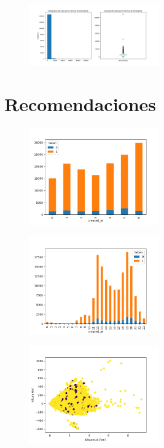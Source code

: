 \documentclass[10pt,a4paper]{article}
\begin{document}
		\begin{figure}[h]
			\centering
			\includegraphics[width=0.5\textwidth]{../Img/total_earning}
		\end{figure}
	\section{Recomendaciones}
		\begin{figure}[h]
			\centering
			\includegraphics[width=0.5\textwidth]{../Img/Figure_2}
		\end{figure}
	
		\begin{figure}[h]
			\centering
			\includegraphics[width=0.5\textwidth]{../Img/Figure_3}
		\end{figure}
	
		\begin{figure}[h]
			\centering
			\includegraphics[width=0.5\textwidth]{../Img/Figure_4}
		\end{figure}
	
\end{document}
